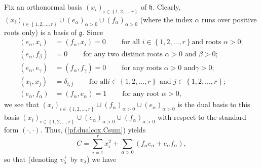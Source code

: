 \documentclass[etingof-lie.tex]{subfiles}
\begin{document}
Fix an orthonormal basis $\left(  x_{i}\right)  _{i\in\left\{
1,2,...,r\right\}  }$ of $\mathfrak{h}$. Clearly, $\left(  x_{i}\right)
_{i\in\left\{  1,2,...,r\right\}  }\cup\left(  e_{\alpha}\right)  _{\alpha
>0}\cup\left(  f_{\alpha}\right)  _{\alpha>0}$ (where the index $\alpha$ runs
over positive roots only) is a basis of $\mathfrak{g}$. Since%
\begin{align*}
\left(  e_{\alpha},x_{i}\right)   &  =\left(  f_{\alpha},x_{i}\right)
=0\ \ \ \ \ \ \ \ \ \ \text{for all }i\in\left\{  1,2,...,r\right\}  \text{
and roots }\alpha>0;\\
\left(  e_{\alpha},f_{\beta}\right)   &  =0\ \ \ \ \ \ \ \ \ \ \text{for any
two distinct roots }\alpha>0\text{ and }\beta>0;\\
\left(  e_{\alpha},e_{\gamma}\right)   &  =\left(  f_{\alpha},f_{\gamma
}\right)  =0\ \ \ \ \ \ \ \ \ \ \text{for any roots }\alpha>0\text{ and
}\gamma>0;\\
\left(  x_{i},x_{j}\right)   &  =\delta_{i,j}\ \ \ \ \ \ \ \ \ \ \text{for all
}i\in\left\{  1,2,...,r\right\}  \text{ and }j\in\left\{  1,2,...,r\right\}
;\\
\left(  e_{\alpha},f_{\alpha}\right)   &  =\left(  f_{\alpha},e_{\alpha
}\right)  =1\ \ \ \ \ \ \ \ \ \ \text{for any root }\alpha>0\text{,}%
\end{align*}
we see that $\left(  x_{i}\right)  _{i\in\left\{  1,2,...,r\right\}  }%
\cup\left(  f_{\alpha}\right)  _{\alpha>0}\cup\left(  e_{\alpha}\right)
_{\alpha>0}$ is the dual basis to this basis $\left(  x_{i}\right)
_{i\in\left\{  1,2,...,r\right\}  }\cup\left(  e_{\alpha}\right)  _{\alpha
>0}\cup\left(  f_{\alpha}\right)  _{\alpha>0}$ with respect to the standard
form $\left(  \cdot,\cdot\right)  $. Thus, (\ref{pf.dualcox.Csum}) yields%
\[
C=\sum\limits_{i=1}^{r}x_{i}^{2}+\sum\limits_{\alpha>0}\left(  f_{\alpha
}e_{\alpha}+e_{\alpha}f_{\alpha}\right)  ,
\]
so that (denoting $v_{\lambda}^{+}$ by $v_{\lambda}$) we have%
\end{document}
